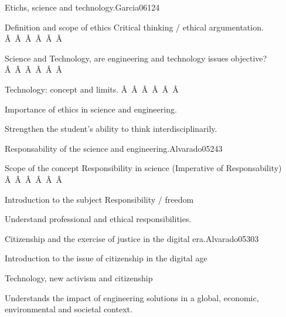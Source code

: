 \begin{syllabus}
\begin{unit}{Etichs, science and technology.}{}{Garcia06}{12}{4}
   \begin{topics}
      \item Definition and scope of ethics Critical thinking / ethical argumentation.
Â Â Â Â Â Â \item Science and Technology, are engineering and technology issues objective?
Â Â Â Â Â Â \item Technology: concept and limits.
Â Â Â Â Â Â \item Importance of ethics in science and engineering.
   \end{topics}
   \begin{learningoutcomes}
      \item Strengthen the student's ability to think interdisciplinarily.
   \end{learningoutcomes}
\end{unit}


\begin{unit}{Responsability of the science and engineering.}{}{Alvarado05}{24}{3}
   \begin{topics}
      \item Scope of the concept Responsibility in science (Imperative of Responsability)
Â Â Â Â Â Â \item Introduction to the subject Responsibility / freedom
   \end{topics}

   \begin{learningoutcomes}
      \item Understand professional and ethical responsibilities.
   \end{learningoutcomes}
\end{unit}

\begin{unit}{Citizenship and the exercise of justice in the digital era.}{}{Alvarado05}{30}{3}
   \begin{topics}
      \item Introduction to the issue of citizenship in the digital age
      \item Technology, new activism and citizenship
   \end{topics}

   \begin{learningoutcomes}
      \item  Understands the impact of engineering solutions in a global, economic, environmental and societal context.
   \end{learningoutcomes}
\end{unit}



\begin{coursebibliography}
\end{coursebibliography}

\end{syllabus}
